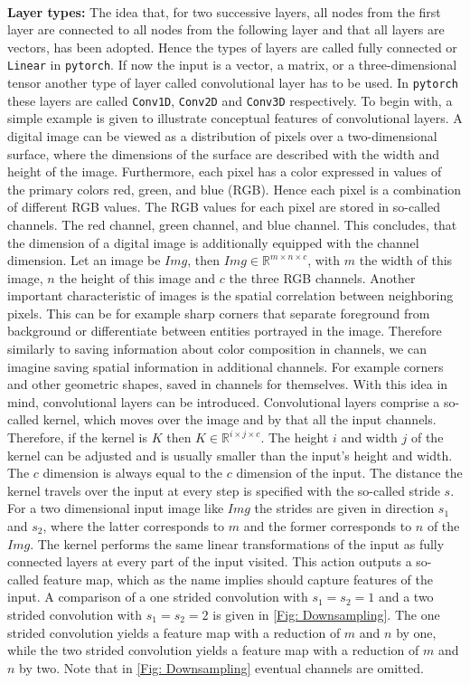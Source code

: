\\
\textbf{Layer types:} The idea that, for two successive layers, all nodes from the first layer are connected to all nodes from the following layer and that all layers are vectors, has been adopted. Hence the types of layers are called fully connected or \texttt{Linear} in \texttt{pytorch}\cite{torch_ini}. If now the input is a vector, a matrix, or a three-dimensional tensor another type of layer called convolutional layer has to be used. In \texttt{pytorch} these layers are called \texttt{Conv1D}, \texttt{Conv2D} and \texttt{Conv3D} respectively.  
To begin with, a simple example is given to illustrate conceptual features of convolutional layers. A digital image can be viewed as a distribution of pixels over a two-dimensional surface, where the dimensions of the surface are described with the width and height of the image. Furthermore, each pixel has a color expressed in values of the primary colors red, green, and blue (RGB). Hence each pixel is a combination of different RGB values. The RGB values for each pixel are stored in so-called channels. The red channel, green channel, and blue channel. This concludes, that the dimension of a digital image is additionally equipped with the channel dimension. Let an image be \(Img\), then  \(Img \in \mathbb{R}^{m\times n\times c}\), with \(m\) the width of this image, \(n\) the height of this image and \(c\) the three RGB channels. Another important characteristic of images is the spatial correlation between neighboring pixels. This can be for example sharp corners that separate foreground from background or differentiate between entities portrayed in the image. Therefore similarly to saving information about color composition in channels, we can imagine saving spatial information in additional channels. For example corners and other geometric shapes,  saved in channels for themselves. With this idea in mind, convolutional layers can be introduced. Convolutional layers comprise a so-called kernel, which moves over the image and by that all the input channels. Therefore, if the kernel is $K$ then $K \in \mathbb{R}^{i\times j\times c}$. The height $i$ and width $j$ of the kernel can be adjusted and is usually smaller than the input's height and width. The $c$ dimension is always equal to the $c$ dimension of the input. The distance the kernel travels over the input at every step is specified with the so-called stride $s$. For a two dimensional input image like $Img$ the strides are given in direction $s_1$  and $s_2$, where the latter corresponds to $m$ and the former corresponds to $n$ of the $Img$. The kernel performs the same linear transformations of the input as fully connected layers at every part of the input visited. This action outputs a so-called feature map, which as the name implies should capture features of the input. A comparison of a one strided convolution with $s_1=s_2=1$ and a two strided convolution with $s_1=s_2=2$ is given in \cref{Fig: Downsampling}. The one strided convolution yields a feature map with a reduction of $m$ and $n$ by one, while the two strided convolution yields a feature map with a reduction of $m$ and $n$ by two. Note that in \cref{Fig: Downsampling} eventual channels are omitted.\\
